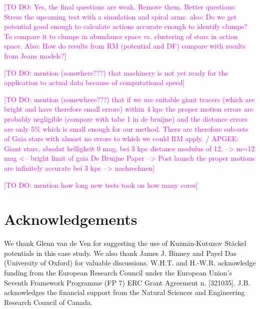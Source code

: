 \documentclass[iop,revtex4]{emulateapj}
\newcommand{\Wilma}[1]{\textcolor{Magenta}{#1}}
\begin{document}
\Wilma{[TO DO: Yes, the final questions are weak. Remove them. Better questions: Stress the upcoming test with a simulation and spiral arms. also: Do we get potential good enough to calculate actions accurate enough to identify clumps? To compare it to clumps in abundance space vs. clustering of stars in action space. Also: How do results from RM (potential and DF) compare with results from Jeans models?]}

\Wilma{[TO DO: mention (somwhere???) that machinery is not yet ready for the application to actual data because of computational speed]}

\Wilma{[TO DO: mention (somewhere???) that if we use suitable giant tracers (which are bright and have therefore small errors) within 4 kpc the proper motion errors are probably negligible (compare with tabe 1 in de bruijne) and the distance errors are only 5\% which is small enough for our method. There are therefore sub-sets of Gaia stars with almost no errors to which we could RM apply. / APGEE: Giant stars, absolut helligkeit 0 mag, bei 3 kpc distance modulus
of 12, --> m=12 mag <-- bright limit of gaia
De Bruijne Paper --> Post launch
the proper motions are infinitely accurate bei 3 kpc --> nachrechnen]}

\Wilma{[TO DO: mention how long new tests took on how many cores]}

\section{Acknowledgements}

We thank Glenn van de Ven for suggesting the use of Kuzmin-Kutuzov St\"{a}ckel potentials in this case study. We also thank James J. Binney and Payel Das (University of Oxford) for valuable discussions. W.H.T. and H.-W.R. acknowledge funding from the European  Research Council under the European Union's Seventh Framework Programme (FP 7) ERC Grant Agreement n. [321035]. J.B. acknowledges the financial support from the Natural Sciences and Engineering Research Council of Canada. 
\end{document}
